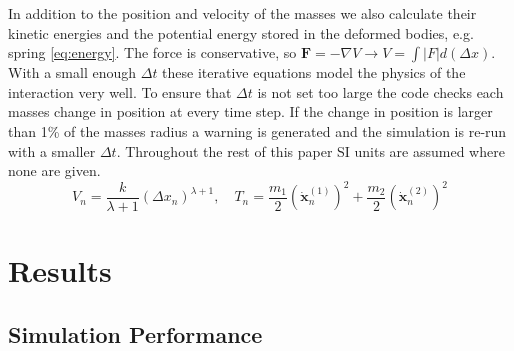 \documentclass[aps,prl,floatfix,preprint,nofootinbib]{revtex4}
\begin{document}
In addition to the position and velocity of the masses we also calculate their kinetic energies and the potential energy stored in the deformed bodies, e.g. spring \eqref{eq:energy}. The force is conservative, so $\mathbf{F} = - \nabla V \rightarrow V = \int \left|F\right| d\left(\Delta x\right)$. With a small enough $\Delta t$ these iterative equations model the physics of the interaction very well. To ensure that $\Delta t$ is not set too large the code checks each masses change in position at every time step. If the change in position is larger than 1\% of the masses radius a warning is generated and the simulation is re-run with a smaller $\Delta t$. Throughout the rest of this paper SI units are assumed where none are given.
\begin{equation}\label{eq:energy}
  V_n = \frac{k}{\lambda+1}\left(\Delta x_n\right)^{\lambda+1},\quad T_n = \frac{m_1}{2}\left(\dot{\mathbf{x}}^{(1)}_n\right)^2 + \frac{m_2}{2}\left(\dot{\mathbf{x}}^{(2)}_n\right)^2
\end{equation}

\section{Results}
\subsection{Simulation Performance}
\end{document}
